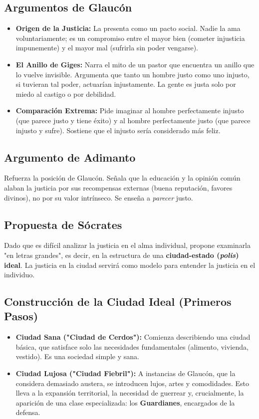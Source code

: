 \documentclass[11pt, a4paper]{article}
\begin{document}
\subsection*{Argumentos de Glaucón}
\begin{itemize}
    \item \textbf{Origen de la Justicia:} La presenta como un pacto social. Nadie la ama voluntariamente; es un compromiso entre el mayor bien (cometer injusticia impunemente) y el mayor mal (sufrirla sin poder vengarse).
    \item \textbf{El Anillo de Giges:} Narra el mito de un pastor que encuentra un anillo que lo vuelve invisible. Argumenta que tanto un hombre justo como uno injusto, si tuvieran tal poder, actuarían injustamente. La gente es justa solo por miedo al castigo o por debilidad.
    \item \textbf{Comparación Extrema:} Pide imaginar al hombre perfectamente injusto (que parece justo y tiene éxito) y al hombre perfectamente justo (que parece injusto y sufre). Sostiene que el injusto sería considerado más feliz.
\end{itemize}

\subsection*{Argumento de Adimanto}
Refuerza la posición de Glaucón. Señala que la educación y la opinión común alaban la justicia por sus recompensas externas (buena reputación, favores divinos), no por su valor intrínseco. Se enseña a \textit{parecer} justo.

\subsection*{Propuesta de Sócrates}
Dado que es difícil analizar la justicia en el alma individual, propone examinarla "en letras grandes", es decir, en la estructura de una \textbf{ciudad-estado (\textit{polis}) ideal}. La justicia en la ciudad servirá como modelo para entender la justicia en el individuo.

\subsection*{Construcción de la Ciudad Ideal (Primeros Pasos)}
\begin{itemize}
    \item \textbf{Ciudad Sana ("Ciudad de Cerdos"):} Comienza describiendo una ciudad básica, que satisface solo las necesidades fundamentales (alimento, vivienda, vestido). Es una sociedad simple y sana.
    \item \textbf{Ciudad Lujosa ("Ciudad Fiebril"):} A instancias de Glaucón, que la considera demasiado austera, se introducen lujos, artes y comodidades. Esto lleva a la expansión territorial, la necesidad de guerrear y, crucialmente, la aparición de una clase especializada: los \textbf{Guardianes}, encargados de la defensa.
\end{itemize}
\end{document}
